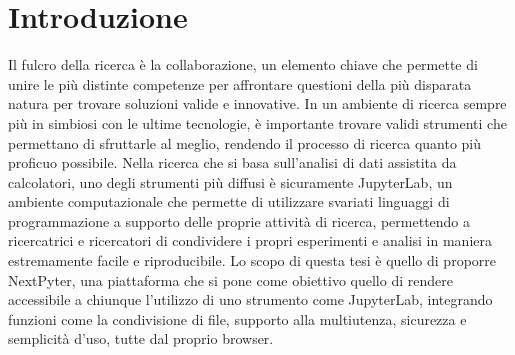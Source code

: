 \chapter{Introduzione}
Il fulcro della ricerca è la collaborazione, un elemento chiave che permette di unire le più distinte competenze per affrontare questioni della più disparata natura per trovare soluzioni valide e innovative. In un ambiente di ricerca sempre più in simbiosi con le ultime tecnologie, è importante trovare validi strumenti che permettano di sfruttarle al meglio, rendendo il processo di ricerca quanto più proficuo possibile.
\newline
\newline
Nella ricerca che si basa sull’analisi di dati assistita da calcolatori, uno degli strumenti più diffusi è sicuramente JupyterLab, un ambiente computazionale che permette di utilizzare svariati linguaggi di programmazione a supporto delle proprie attività di ricerca, permettendo a ricercatrici e ricercatori di condividere i propri esperimenti e analisi in maniera estremamente facile e riproducibile.
\newline
Lo scopo di questa tesi è quello di proporre NextPyter, una piattaforma che si pone come obiettivo quello di rendere accessibile a chiunque l’utilizzo di uno strumento come JupyterLab, integrando funzioni come la condivisione di file, supporto alla multiutenza, sicurezza e semplicità d’uso, tutte dal proprio browser.
